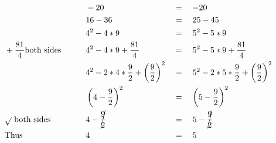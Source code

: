 \begin{alignat*}{3}
&\,&&-20&&=\quad-20\\
&\,&&16-36&&=\quad25-45\\
&\,&&4^2-4*9&&=\quad5^2-5*9\\
&+\frac{81}{4}\mathrm{both~sides}\qquad&&4^2-4*9+\frac{81}{4}&&=\quad5^2-5*9+\frac{81}{4}\\
&\,&&4^2-2*4*\frac{9}{2}+\left(\frac{9}{2}\right)^2&&=\quad5^2-2*5*\frac{9}{2}+\left(\frac{9}{2}\right)^2\\
&\,&&\left(4-\frac{9}{2}\right)^2&&=\quad\left(5-\frac{9}{2}\right)^2\\
&\sqrt{}~\mathrm{both~sides}&&4-\cancel{\frac{9}{2}}&&=\quad5-\cancel{\frac{9}{2}}\\
&\mathrm{Thus}&&4&&=\quad5
\end{alignat*}
